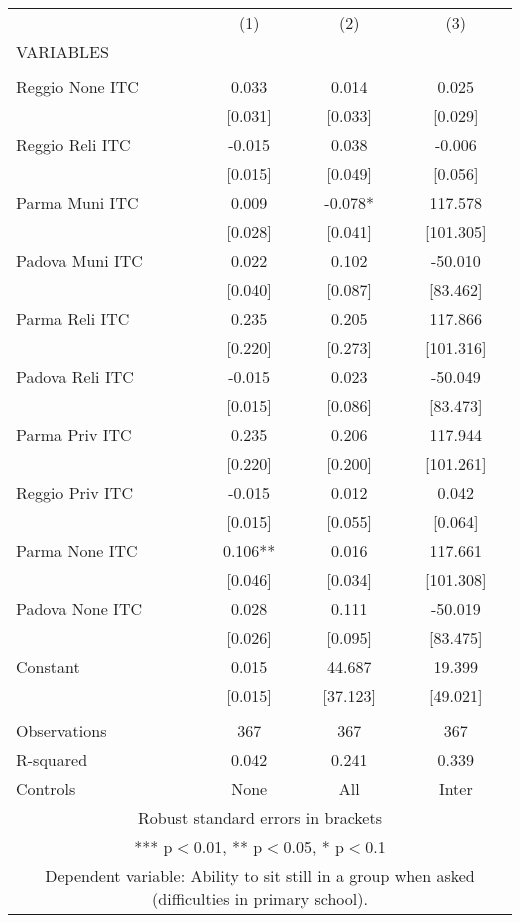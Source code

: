 \begin{tabular}{lccc} \hline
 & (1) & (2) & (3) \\
VARIABLES &  &  &  \\ \hline
 &  &  &  \\
Reggio None ITC & 0.033 & 0.014 & 0.025 \\
 & [0.031] & [0.033] & [0.029] \\
Reggio Reli ITC & -0.015 & 0.038 & -0.006 \\
 & [0.015] & [0.049] & [0.056] \\
Parma Muni ITC & 0.009 & -0.078* & 117.578 \\
 & [0.028] & [0.041] & [101.305] \\
Padova Muni ITC & 0.022 & 0.102 & -50.010 \\
 & [0.040] & [0.087] & [83.462] \\
Parma Reli ITC & 0.235 & 0.205 & 117.866 \\
 & [0.220] & [0.273] & [101.316] \\
Padova Reli ITC & -0.015 & 0.023 & -50.049 \\
 & [0.015] & [0.086] & [83.473] \\
Parma Priv ITC & 0.235 & 0.206 & 117.944 \\
 & [0.220] & [0.200] & [101.261] \\
Reggio Priv ITC & -0.015 & 0.012 & 0.042 \\
 & [0.015] & [0.055] & [0.064] \\
Parma None ITC & 0.106** & 0.016 & 117.661 \\
 & [0.046] & [0.034] & [101.308] \\
Padova None ITC & 0.028 & 0.111 & -50.019 \\
 & [0.026] & [0.095] & [83.475] \\
Constant & 0.015 & 44.687 & 19.399 \\
 & [0.015] & [37.123] & [49.021] \\
 &  &  &  \\
Observations & 367 & 367 & 367 \\
R-squared & 0.042 & 0.241 & 0.339 \\
 Controls & None & All & Inter \\ \hline
\multicolumn{4}{c}{ Robust standard errors in brackets} \\
\multicolumn{4}{c}{ *** p$<$0.01, ** p$<$0.05, * p$<$0.1} \\
\multicolumn{4}{c}{ Dependent variable: Ability to sit still in a group when asked (difficulties in primary school).} \\
\end{tabular}
